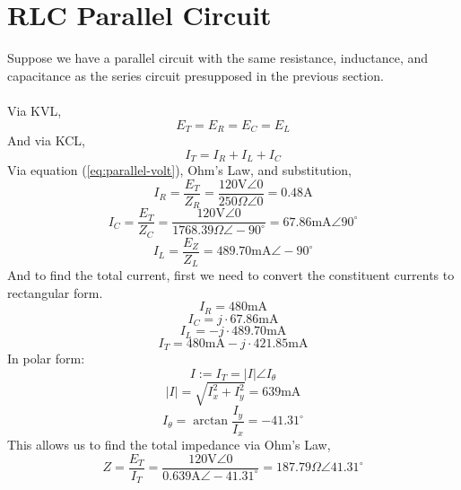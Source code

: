 \documentclass{article}
\begin{document}
	\section[Parallel]{RLC Parallel Circuit}
	Suppose we have a parallel circuit with the same resistance, inductance, 
	and capacitance as the series circuit presupposed in the previous section. 
	\\ \\
	Via KVL,
	\begin{equation}\label{eq:parallel-volt}
		E_T=E_R=E_C=E_L
	\end{equation}
	And via KCL,
	\begin{equation}\label{eq:parallel-curr}
		I_T=I_R + I_L + I_C
	\end{equation}
	Via equation (\ref{eq:parallel-volt}), Ohm's Law, and substitution,
	$$ I_R = \frac{E_T}{Z_R} = \frac{120\text{V}\angle0}{250\Omega\angle0} = 
	0.48\text{A}$$
	$$ I_C = \frac{E_T}{Z_C} = 
	\frac{120\text{V}\angle0}{1768.39\Omega\angle-90^{\circ}} = 67.86\text{mA} 
	\angle90^{\circ}$$
	$$ I_L = \frac{E_Z}{Z_L} = 489.70\text{mA}\angle-90^{\circ}$$
	And to find the total current, first we need to convert the constituent 
	currents to rectangular form.
	$$ I_R = 480\text{mA}$$
	$$ I_C = j \cdot 67.86\text{mA}$$
	$$ I_L = - j \cdot 489.70\text{mA}$$
	$$ I_T = 480\text{mA} - j \cdot 421.85\text{mA}$$
	In polar form:
	$$ I:=I_T=|I|\angle I_\theta$$
	$$ |I| = \sqrt{I_x^2 + I_y^2} = 639\text{mA}$$
	$$ I_\theta = \arctan \frac{I_y}{I_x} = -41.31^{\circ}$$
	This allows us to find the total impedance via Ohm's Law,
	$$ Z = \frac{E_T}{I_T} = 
	\frac{120\text{V}\angle0}{0.639\text{A}\angle-41.31^{\circ}}=187.79\Omega\angle41.31^{\circ}$$
\end{document}
